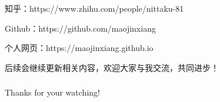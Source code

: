 \documentclass[compress,aspectratio=169]{beamer}
\begin{document}
\begin{frame}
\begin{center}
	\large
	知乎：https://www.zhihu.com/people/nittaku-81
\end{center}

\begin{center}
	\large
	Github：https://github.com/maojinxiang
\end{center}

\begin{center}
	\large
	个人网页：https://maojinxiang.github.io
\end{center}

\begin{center}
	\large
	后续会继续更新相关内容，欢迎大家与我交流，共同进步！
\end{center}








\end{frame}



\begin{frame}
    \frametitle{}
    \huge
    \begin{center}
        Thanks for your watching!
    \end{center}
\end{frame}
\end{document}
